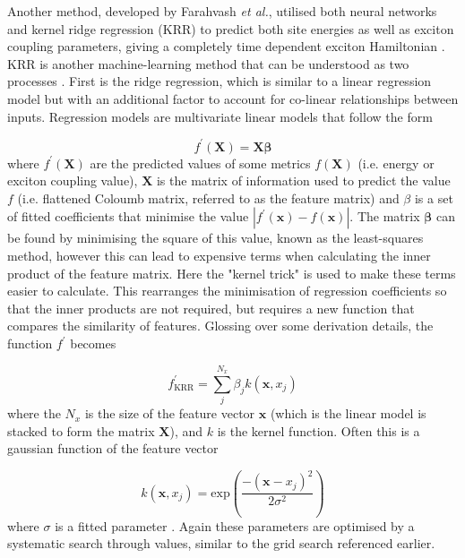 Another method, developed by Farahvash \emph{et al.}, utilised both neural networks
and kernel ridge regression (KRR) to predict both site energies as well as exciton 
coupling parameters, giving a completely time dependent exciton Hamiltonian \cite{Farahvash2020}. 
KRR is another machine-learning method that can be understood as two processes \cite{Hastie2009}. 
First is the ridge regression, which is similar to a linear regression model but 
with an additional factor to account for co-linear relationships between inputs.
Regression models are multivariate linear models that follow the form

\begin{equation}
	f^\prime\left(\mathbf{X}\right) = \mathbf{X} \mathbf{\beta}
\end{equation}
%
where $f^\prime\left(\mathbf{X}\right)$ are the predicted values of some metrics $f\left(\mathbf{X}\right)$ 
(i.e. \Qy energy or exciton coupling value), $\mathbf{X}$ is the matrix of information
used to predict the value $f$ (i.e. flattened Coloumb matrix, referred to as the feature
matrix) and $\beta$ is a set of fitted coefficients that minimise the value $\left\lvert f^\prime \left( \mathbf{x}\right) - f \left(\mathbf{x}\right)\right\rvert$.
The matrix $\mathbf{\beta}$ can be found by minimising the square of this value, 
known as the least-squares method, however this can lead to expensive terms when
calculating the inner product of the feature matrix. Here the "kernel trick" is 
used to make these terms easier to calculate. This rearranges the minimisation of
regression coefficients so that the inner products are not required, but requires 
a new function that compares the similarity of features. Glossing over some derivation
details, the function $f^\prime$ becomes

\begin{equation}
	f_{\text{KRR}}^\prime = \sum^{N_x}_j \beta_j k\left(\mathbf{x}, x_j\right)
\end{equation}
%
where the $N_x$ is the size of the feature vector $\mathbf{x}$ (which is the linear
model is stacked to form the matrix $\mathbf{X}$), and $k$ is the kernel function.
Often this is a gaussian function of the feature vector

\begin{equation}
	k\left(\mathbf{x}, x_j\right) = \text{exp}\left(\frac{-\left(\mathbf{x}-x_j\right)^2}{2\sigma^2}\right)
\end{equation}
%
where $\sigma$ is a fitted parameter \cite{Rasmussen2006}. Again these parameters 
are optimised by a systematic search through values, similar to the grid search
referenced earlier.

